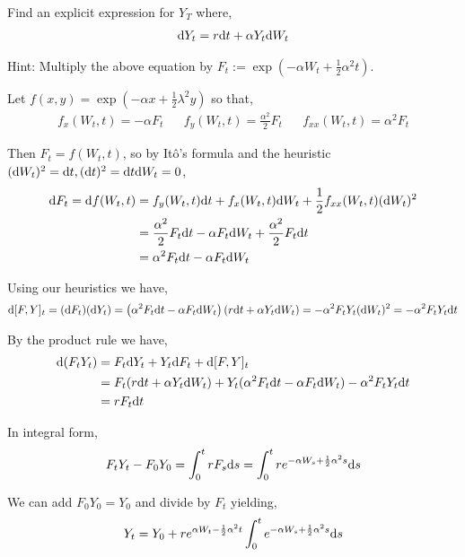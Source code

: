 \begin{problem}[Exercise 8.2]
Find an explicit expression for \( Y_T \) where,
\begin{align*}
    \mathrm{d} Y_t = r \mathrm{d} t + \alpha Y_t \mathrm{d} W_t
\end{align*}

    Hint: Multiply the above equation by \( F_t := \exp(- \alpha W_t + \frac{1}{2} \alpha^2t) \).

\end{problem}


\begin{solution}[Solution]
Let \( f(x,y) = \exp(-\alpha x + \frac{1}{2} \lambda^2 y) \) so that,
\begin{align*}
    f_x(W_t,t) = -\alpha F_t && f_y(W_t,t) = \frac{\alpha^2}{2} F_t && f_{xx}(W_t,t) =  \alpha^2 F_t
\end{align*}

Then \( F_t = f(W_t,t) \), so by It\^o's formula and the heuristic \( (\mathrm{d} W_t)^2 =\mathrm{d} t, (\mathrm{d} t)^2 = \mathrm{d} t \mathrm{d} W_t = 0 \),
\begin{align*}
    \mathrm{d} F_t = \mathrm{d} f(W_t,t) &= f_y(W_t,t) \mathrm{d} t +  f_x(W_t,t) \mathrm{d} W_t + \frac{1}{2} f_{xx}(W_t,t) (\mathrm{d} W_t)^2 
    \\&= \frac{\alpha^2}{2}  F_t \mathrm{d} t -\alpha F_t \mathrm{d} W_t + \frac{\alpha^2}{2} F_t \mathrm{d} t
    \\&= \alpha^2 F_t \mathrm{d} t- \alpha F_t \mathrm{d} W_t
\end{align*}


Using our heuristics we have,
\begin{align*}
    \mathrm{d}[F,Y]_t = (\mathrm{d} F_t)(\mathrm{d} Y_t) = \left( \alpha^2 F_t \mathrm{d} t - \alpha F_t \mathrm{d} W_t \right) \left( r \mathrm{d} t + \alpha Y_t \mathrm{d} W_t \right)
    = -\alpha^2 F_tY_t (\mathrm{d} W_t)^2 
    = -\alpha^2 F_tY_t \mathrm{d} t
\end{align*}


By the product rule we have,
\begin{align*}
    \mathrm{d} (F_tY_t) &=  F_t \mathrm{d} Y_t + Y_t \mathrm{d} F_t + \mathrm{d}[F,Y]_t
    \\&= F_t (r\mathrm{d} t+\alpha Y_t \mathrm{d} W_t) + Y_t (\alpha^2 F_t \mathrm{d} t-\alpha F_t \mathrm{d} W_t) - \alpha^2 F_t Y_t \mathrm{d} t
    \\&= r F_t \mathrm{d} t 
\end{align*}

In integral form,
\begin{align*}
    F_t Y_t - F_0Y_0 = \int_{0}^{t}r F_s \mathrm{d} s = \int_{0}^{t} r e^{-\alpha W_s + \frac{1}{2} \alpha^2 s} \mathrm{d} s
\end{align*}

We can add \( F_0Y_0 = Y_0 \) and divide by \( F_t \) yielding,
\begin{align*}
    Y_t = Y_0 + r e^{\alpha W_t - \frac{1}{2}\alpha^2 t} \int_{0}^{t} e^{-\alpha W_s + \frac{1}{2} \alpha^2 s} \mathrm{d} s
\end{align*}
\end{solution}

